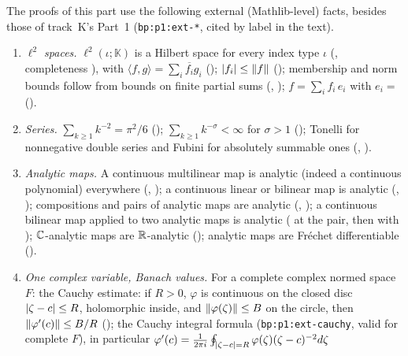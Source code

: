 The proofs of this part use the following external (Mathlib-level) facts, besides those of track~K's Part~1
(\texttt{bp:p1:ext-*}, cited by label in the text).
{\raggedright
\begin{enumerate}[label=(W1-E\arabic*),ref=(W1-E\arabic*)]
\item\label{bpW:w1:ext-lp} \emph{$\ell^2$ spaces.} $\ell^2(\iota;\mathbb K)$ is a Hilbert space for every index type
  $\iota$ (, completeness ), with
  $\langle f,g\rangle=\sum_i\overline{f_i}g_i$ (); $\lvert f_i\rvert\le\lVert f\rVert$
  (); membership and norm bounds follow from bounds on finite partial sums
  (, ); $f=\sum_if_i\,e_i$ with $e_i=$
   ().
\item\label{bpW:w1:ext-series} \emph{Series.} $\sum_{k\ge1}k^{-2}=\pi^2/6$ ();
  $\sum_{k\ge1}k^{-\sigma}<\infty$ for $\sigma>1$ (); Tonelli for nonnegative
  double series and Fubini for absolutely summable ones (, ).
\item\label{bpW:w1:ext-analytic} \emph{Analytic maps.} A continuous multilinear map is analytic (indeed a continuous
  polynomial) everywhere (, ); a continuous linear or
  bilinear map is analytic (, ); compositions and
  pairs of analytic maps are analytic (, ); a continuous bilinear map
  applied to two analytic maps is analytic ( at the pair, then
   with );
  $\mathbb{C}$-analytic maps are $\mathbb{R}$-analytic (); analytic maps are Fr\'echet
  differentiable ().
\item\label{bpW:w1:ext-onevar} \emph{One complex variable, Banach values.} For a complete complex normed space $F$:
  the Cauchy estimate: if $R>0$, $\varphi$ is continuous on the closed disc $\lvert \zeta-c\rvert\le R$, holomorphic inside, and
  $\lVert \varphi(\zeta)\rVert\le B$ on the circle, then $\lVert \varphi'(c)\rVert\le B/R$ (); the Cauchy
  integral formula (\texttt{bp:p1:ext-cauchy}, valid for complete $F$), in particular
  $\varphi'(c)=\frac1{2\pi i}\oint_{\lvert \zeta-c\rvert=R}\varphi(\zeta)(\zeta-c)^{-2}d\zeta$

\end{enumerate}}
